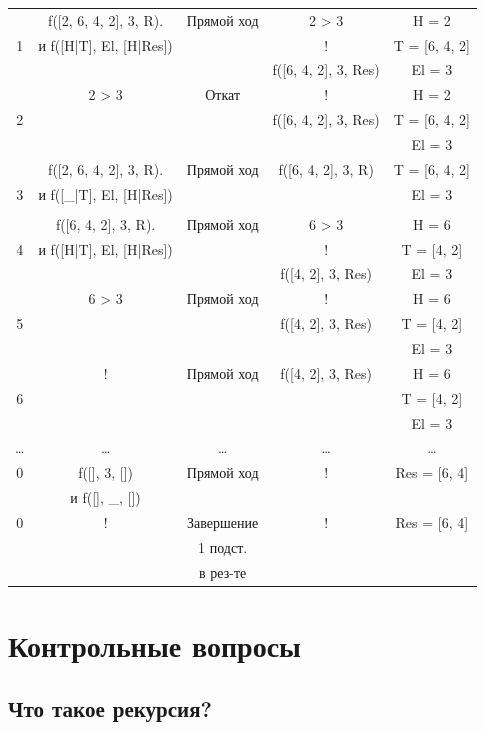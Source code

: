 \begin{landscape}
\begin{longtable}{|c|c|c|c|c|}
      \hline
            & f([2, 6, 4, 2], 3, R). & Прямой ход & 2 > 3 & H = 2\\
          1 & и f([H|T], El, [H|Res]) & & ! & T = [6, 4, 2]\\
      & & & f([6, 4, 2], 3, Res) & El = 3\\
    \hline
            & 2 > 3 & Откат & ! & H = 2\\
          2 & & & f([6, 4, 2], 3, Res) & T = [6, 4, 2]\\
      & & & & El = 3\\
    \hline
            & f([2, 6, 4, 2], 3, R). & Прямой ход & f([6, 4, 2], 3, R) & T = [6, 4, 2]\\
          3 & и f([\_|T], El, [H|Res]) & & & El = 3\\
      & & & & \\
    \hline
      & f([6, 4, 2], 3, R). & Прямой ход & 6 > 3 & H = 6\\
          4 & и f([H|T], El, [H|Res]) & & ! & T = [4, 2]\\
      & & & f([4, 2], 3, Res) & El = 3\\
    \hline
      & 6 > 3  & Прямой ход & ! & H = 6\\
          5 & & & f([4, 2], 3, Res) & T = [4, 2]\\
      & & &  & El = 3\\
    \hline
            & ! & Прямой ход & f([4, 2], 3, Res) & H = 6\\
          6 & & & & T = [4, 2]\\
      & & & & El = 3\\
    \hline
    \hline
    \dots & \dots & \dots & \dots & \dots \\
    \hline 
    0 & f([], 3, []) & Прямой ход & ! & Res = [6, 4]\\
            & и f([], \_, []) & & &\\
          \hline 
    0 & ! & Завершение & ! & Res = [6, 4]\\
            & & 1 подст. & &\\
            & & в рез-те & &\\
  \end{longtable}
\end{landscape}

\section*{Контрольные вопросы}

\subsection*{Что такое рекурсия?}

